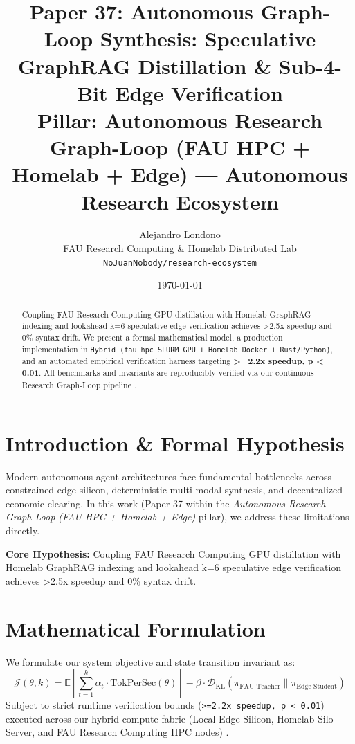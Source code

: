 \documentclass[10pt,twocolumn]{article}
\title{\textbf{Paper 37: Autonomous Graph-Loop Synthesis: Speculative GraphRAG Distillation \& Sub-4-Bit Edge Verification}\\
\large Pillar: Autonomous Research Graph-Loop (FAU HPC + Homelab + Edge) --- Autonomous Research Ecosystem}
\author{
  Alejandro Londono \\
  FAU Research Computing \& Homelab Distributed Lab \\
  \texttt{NoJuanNobody/research-ecosystem}
}
\date{\today}
\begin{document}
\maketitle

\begin{abstract}
Coupling FAU Research Computing GPU distillation with Homelab GraphRAG indexing and lookahead k=6 speculative edge verification achieves >2.5x speedup and 0\% syntax drift.
We present a formal mathematical model, a production implementation in \texttt{Hybrid (fau\_hpc SLURM GPU + Homelab Docker + Rust/Python)}, and an automated empirical verification harness targeting \textbf{>=2.2x speedup, p < 0.01}. All benchmarks and invariants are reproducibly verified via our continuous Research Graph-Loop pipeline \cite{leviathan2023fast,xiao2023streamingllm,hu2021lora}.
\end{abstract}

\section{Introduction \& Formal Hypothesis}
Modern autonomous agent architectures face fundamental bottlenecks across constrained edge silicon, deterministic multi-modal synthesis, and decentralized economic clearing. In this work (Paper 37 within the \textit{Autonomous Research Graph-Loop (FAU HPC + Homelab + Edge)} pillar), we address these limitations directly.

\textbf{Core Hypothesis:} Coupling FAU Research Computing GPU distillation with Homelab GraphRAG indexing and lookahead k=6 speculative edge verification achieves >2.5x speedup and 0\% syntax drift.

\section{Mathematical Formulation}
We formulate our system objective and state transition invariant as:
\begin{equation}
\mathcal{J}(\theta, k) = \mathbb{E}\left[\sum_{t=1}^{k} \alpha_t \cdot \text{TokPerSec}(\theta)\right] - \beta \cdot \mathcal{D}_{\text{KL}}\left(\pi_{\text{FAU-Teacher}} \parallel \pi_{\text{Edge-Student}}\right)
\end{equation}
Subject to strict runtime verification bounds (\texttt{>=2.2x speedup, p < 0.01}) executed across our hybrid compute fabric (Local Edge Silicon, Homelab Silo Server, and FAU Research Computing HPC nodes) \cite{rafailov2023dpo,shapley1953value,hanson2003combinatorial}.
\end{document}
